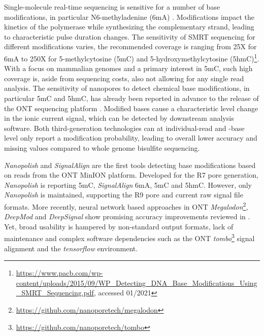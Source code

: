 Single-molecule real-time sequencing is sensitive for a number of base modifications, in particular N6-methyladenine (6mA) \cite{Flusberg2010}.
Modifications impact the kinetics of the polymerase while synthesizing the complementary strand, leading to characteristic pulse duration changes.
The sensitivity of SMRT sequencing for different modifications varies, the recommended coverage is ranging from 25X for 6mA to 250X for 5-methylcytosine (5mC) and 5-hydroxymethylcytosine (5hmC)\footnote{\url{https://www.pacb.com/wp-content/uploads/2015/09/WP_Detecting_DNA_Base_Modifications_Using_SMRT_Sequencing.pdf}, accessed 01/2021}.
With a focus on mammalian genomes and a primary interest in 5mC, such high coverage is, aside from sequencing costs, also not allowing for any single read analysis.
The sensitivity of nanopores to detect chemical base modifications, in particular 5mC and 5hmC, has already been reported in advance to the release of the ONT sequencing platform \cite{Laszlo2013, Schreiber2013}.
Modified bases cause a characteristic level change in the ionic current signal, which can be detected by downstream analysis software.
Both third-generation technologies can at individual-read and -base level only report a modification probability, leading to overall lower accuracy and missing values compared to whole genome bisulfite sequencing.

\textit{Nanopolish} \cite{Simpson2017} and \textit{SignalAlign} \cite{Rand2017} are the first tools detecting base modifications based on reads from the ONT MinION platform.
Developed for the R7 pore generation, \textit{Nanopolish} is reporting 5mC, \textit{SignalAlign} 6mA, 5mC and 5hmC.
However, only \textit{Nanopolish} is maintained, supporting the R9 pore and current raw signal file formats.
More recently, neural network based approaches in ONT \textit{Megalodon}\footnote{\url{https://github.com/nanoporetech/megalodon}}, \textit{DeepMod} \cite{Liu2019a} and \textit{DeepSignal} \cite{Ni2018} show promising accuracy improvements reviewed in \cite{Yuen2020}.
Yet, broad usability is hampered by non-standard output formats, lack of maintenance and complex software dependencies such as the ONT \textit{tombo}\footnote{\url{https://github.com/nanoporetech/tombo}} signal alignment and the \textit{tensorflow} environment.

